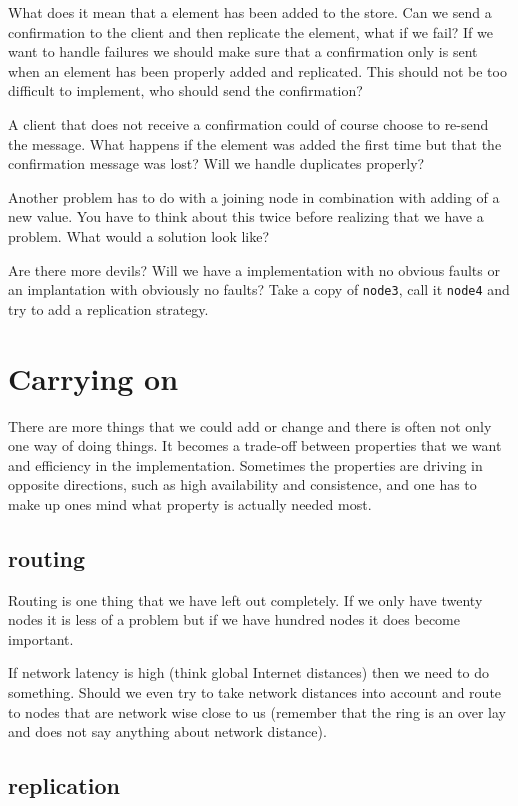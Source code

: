 \documentclass[a4paper,11pt]{article}
\begin{document}
What does it mean that a element has been added to the store. Can we
send a confirmation to the client and then replicate the element, what
if we fail? If we want to handle failures we should make sure that a
confirmation only is sent when an element has been properly added and
replicated. This should not be too difficult to implement, who should
send the confirmation?

A client that does not receive a confirmation could of course
choose to re-send the message. What happens if the element was
added the first time but that the confirmation message was lost? Will
we handle duplicates properly?

Another problem has to do with a joining node in combination with
adding of a new value. You have to think about this twice before
realizing that we have a problem. What would a solution look like?

Are there more devils? Will we have a implementation with no obvious
faults or an implantation with obviously no faults? Take a copy of
{\tt node3}, call it {\tt node4} and try to add a replication
strategy.

\section{Carrying on}

There are more things that we could add or change and there is often
not only one way of doing things. It becomes a trade-off between
properties that we want and efficiency in the implementation. Sometimes
the properties are driving in opposite directions, such as high
availability and consistence, and one has to make up ones mind what
property is actually needed most.

\subsection{routing}

Routing is one thing that we have left out completely. If we only have
twenty nodes it is less of a problem but if we have hundred nodes it
does become important.

If network latency is high (think global Internet distances) then
we need to do something. Should we even try to take network distances
into account and route to nodes that are network wise close to us
(remember that the ring is an over lay and does not say anything about
network distance). 

\subsection{replication}
\end{document}
